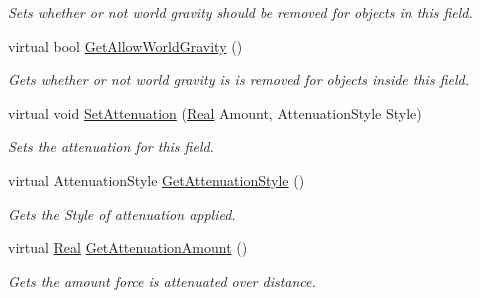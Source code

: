 \begin{DoxyCompactItemize}
\begin{DoxyCompactList}\small\item\em Sets whether or not world gravity should be removed for objects in this field. \item\end{DoxyCompactList}\item 
virtual bool \hyperlink{classphys_1_1GravityWell_a6308d71921477e9031173e6900237f21}{GetAllowWorldGravity} ()
\begin{DoxyCompactList}\small\item\em Gets whether or not world gravity is is removed for objects inside this field. \item\end{DoxyCompactList}\item 
virtual void \hyperlink{classphys_1_1GravityWell_a736d4b9b541b3cada4b0a31f422d6020}{SetAttenuation} (\hyperlink{namespacephys_af7eb897198d265b8e868f45240230d5f}{Real} Amount, AttenuationStyle Style)
\begin{DoxyCompactList}\small\item\em Sets the attenuation for this field. \item\end{DoxyCompactList}\item 
virtual AttenuationStyle \hyperlink{classphys_1_1GravityWell_af6720913923c6376c893bc34bca7e8a4}{GetAttenuationStyle} ()
\begin{DoxyCompactList}\small\item\em Gets the Style of attenuation applied. \item\end{DoxyCompactList}\item 
virtual \hyperlink{namespacephys_af7eb897198d265b8e868f45240230d5f}{Real} \hyperlink{classphys_1_1GravityWell_abcf5f7983c33307a54b362988b2d562a}{GetAttenuationAmount} ()
\begin{DoxyCompactList}\small\item\em Gets the amount force is attenuated over distance. \item\end{DoxyCompactList}\end{DoxyCompactItemize}
